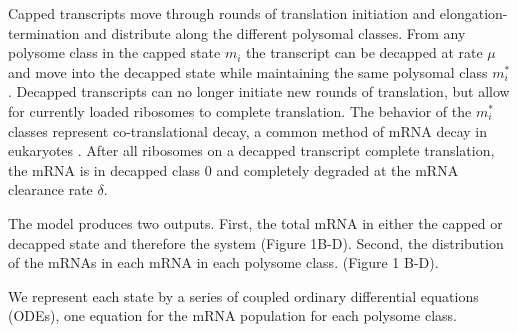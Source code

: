 \documentclass[a4,center,fleqn]{NAR}
\begin{document}
Capped transcripts move through rounds of translation initiation and elongation-termination and distribute along the different polysomal classes. 
From any polysome class in the capped state $m_i$ the transcript can be decapped at rate $\mu$  and move into the decapped state while maintaining the same polysomal class $m_i^*$.
Decapped transcripts can no longer initiate new rounds of translation, but allow for currently loaded ribosomes to complete translation. 
The behavior of the $m_i^*$ classes represent co-translational decay, a common method of mRNA decay in eukaryotes \citep{RN3,RN23,RN4}. 
After all ribosomes on a decapped transcript complete translation, the mRNA is in decapped class 0 and completely degraded at the mRNA clearance rate $\delta$.

The model produces two outputs. 
First, the total mRNA in either the capped or decapped state and therefore the system (Figure 1B-D). 
Second, the distribution of the mRNAs in each mRNA in each polysome class. (Figure 1 B-D).

We represent each state by a series of coupled ordinary differential equations (ODEs), one equation for the mRNA population for each polysome class. 
\end{document}
